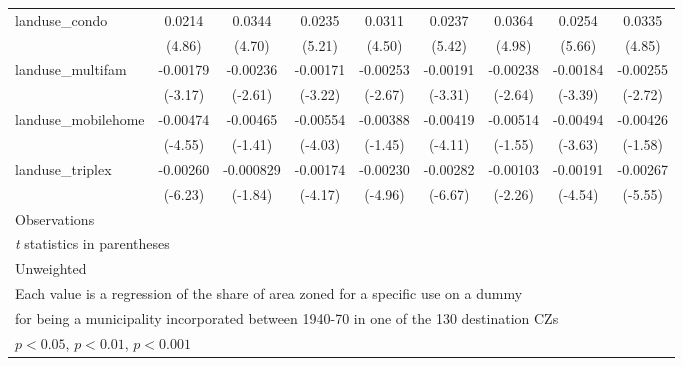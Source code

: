 \begin{table}[htbp]
\begin{tabular}{l*{8}{c}}
\addlinespace
landuse\_condo       &      0.0214\sym{***}&      0.0344\sym{***}&      0.0235\sym{***}&      0.0311\sym{***}&      0.0237\sym{***}&      0.0364\sym{***}&      0.0254\sym{***}&      0.0335\sym{***}\\
                    &      (4.86)         &      (4.70)         &      (5.21)         &      (4.50)         &      (5.42)         &      (4.98)         &      (5.66)         &      (4.85)         \\
\addlinespace
landuse\_multifam    &    -0.00179\sym{**} &    -0.00236\sym{**} &    -0.00171\sym{**} &    -0.00253\sym{**} &    -0.00191\sym{***}&    -0.00238\sym{**} &    -0.00184\sym{***}&    -0.00255\sym{**} \\
                    &     (-3.17)         &     (-2.61)         &     (-3.22)         &     (-2.67)         &     (-3.31)         &     (-2.64)         &     (-3.39)         &     (-2.72)         \\
\addlinespace
landuse\_mobilehome  &    -0.00474\sym{***}&    -0.00465         &    -0.00554\sym{***}&    -0.00388         &    -0.00419\sym{***}&    -0.00514         &    -0.00494\sym{***}&    -0.00426         \\
                    &     (-4.55)         &     (-1.41)         &     (-4.03)         &     (-1.45)         &     (-4.11)         &     (-1.55)         &     (-3.63)         &     (-1.58)         \\
\addlinespace
landuse\_triplex     &    -0.00260\sym{***}&   -0.000829         &    -0.00174\sym{***}&    -0.00230\sym{***}&    -0.00282\sym{***}&    -0.00103\sym{*}  &    -0.00191\sym{***}&    -0.00267\sym{***}\\
                    &     (-6.23)         &     (-1.84)         &     (-4.17)         &     (-4.96)         &     (-6.67)         &     (-2.26)         &     (-4.54)         &     (-5.55)         \\
\midrule
Observations        &                     &                     &                     &                     &                     &                     &                     &                     \\
\bottomrule
\multicolumn{9}{l}{\footnotesize \textit{t} statistics in parentheses}\\
\multicolumn{9}{l}{\footnotesize Unweighted}\\
\multicolumn{9}{l}{\footnotesize Each value is a regression of the share of area zoned for a specific use on a dummy}\\
\multicolumn{9}{l}{\footnotesize for being a municipality incorporated between 1940-70 in one of the 130 destination CZs}\\
\multicolumn{9}{l}{\footnotesize \sym{*} \(p<0.05\), \sym{**} \(p<0.01\), \sym{***} \(p<0.001\)}\\
\end{tabular}
\end{table}
